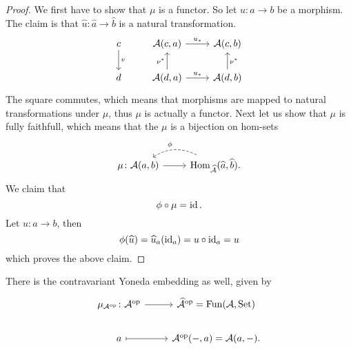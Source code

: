 \begin{proof}
    We first have to show that $\mu$ is a functor. 
    So let $u\colon a \to  b$ be a morphism.
    The claim is that $\widehat{u}\colon \widehat{a} \to \widehat{b}$ is a natural transformation.
    \[
    \begin{tikzcd}
        c
        \arrow[d,"v"]
        &
        \mathcal{A}(c,a)
        \arrow[r,"u_*"]
        &
        \mathcal{A}(c,b)
        \\
        d
        &
        \mathcal{A}(d,a)
        \arrow[u,"\nu^*"]
        \arrow[r,"u_*"]
        &
        \mathcal{A}(d,b)
        \arrow[u,"\nu^*"']
    \end{tikzcd}
    \]
    The square commutes, which means that morphisms are mapped to natural transformations under $\mu$, thus $\mu$ is actually a functor.
    Next let us show that $\mu$ is fully faithfull, which means that the $\mu$ is a bijection on hom-sets
    \[
    \begin{tikzcd}
        \mu \colon \mathcal{A}(a,b) 
        \arrow[r]
        &
        \Hom_\mathcal{\widehat{A}}(\widehat{a}, \widehat{b}).
        \arrow[l, bend right, dashed, "\phi"']
    \end{tikzcd}
    \]
    We claim that
    \[
    \phi \circ \mu = \operatorname{id}.
    \]
    Let $u\colon a \to b$, then
    \[
    \phi(\widehat{u}) = \widehat{u}_a(\operatorname{id}_a) = u \circ \operatorname{id}_a = u
    \]
    which proves the above claim.
\end{proof}

\begin{rmk}
    There is the contravariant Yoneda embedding as well, given by
    \[
    \begin{tikzcd}
        \mu_{\mathcal{A}^{\op}} \colon \mathcal{A}^{\op}
        \arrow[r]
        &
        \widehat{\mathcal{A}}^{\op} = \Fun(\mathcal{A}, \Set)
        \\
        a 
        \arrow[r, mapsto]
        &
        \mathcal{A}^{\op}(-,a)= \mathcal{A}(a,-).
    \end{tikzcd}
    \]
\end{rmk}

